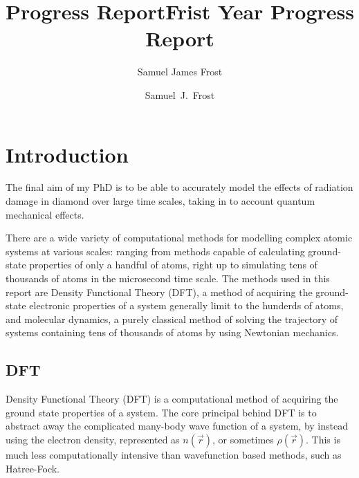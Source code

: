 \documentclass[10pt,a4paper,twocolumn,twoside]{extarticle}
\title{Progress Report}
\author{Samuel James Frost}
\title{Frist Year Progress Report}
\author{Samuel~J.~Frost}
\begin{document}
	\thispagestyle{empty}
	\tableofcontents

	
\section{Introduction}

The final aim of my PhD is to be able to accurately model the effects of radiation damage in diamond over large time scales, taking in to account quantum mechanical effects.


There are a wide variety of computational methods for modelling complex atomic systems at various scales: ranging from methods capable of calculating ground-state properties of only a handful of atoms, right up to simulating tens of thousands of atoms in the microsecond time scale. The methods used in this report are Density Functional Theory (DFT), a method of acquiring the ground-state electronic properties of a system generally limit to the hunderds of atoms, and molecular dynamics, a purely classical method of solving the trajectory of systems containing tens of thousands of atoms by using Newtonian mechanics. 

\subsection{DFT}
Density Functional Theory (DFT) is a computational method of acquiring the ground state properties of a system. 
The core principal behind DFT is to abstract away the complicated many-body wave function of a system, by instead using the electron density, represented as $n(\vec{r})$, or sometimes $\rho(\vec{r})$. This is much less computationally intensive than wavefunction based methods, such as Hatree-Fock. 
\end{document}
